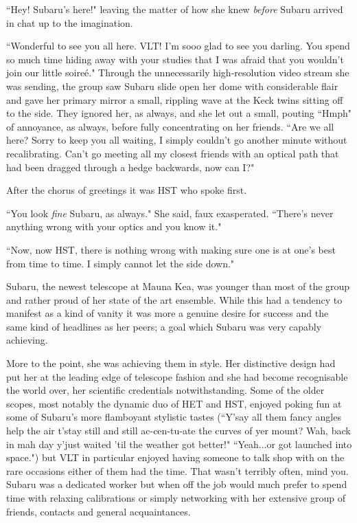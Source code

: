 \documentclass[12pt]{iopart}
\begin{document}
``Hey! Subaru's here!" leaving the matter of how she knew \emph{before} Subaru arrived in chat up to the imagination.

``Wonderful to see you all here. VLT! I'm sooo glad to see you darling. You spend so much time hiding away with your studies that I was afraid that you wouldn't join our little soire\'{e}." Through the unnecessarily high-resolution video stream she was sending, the group saw Subaru slide open her dome with considerable flair and gave her primary mirror a small, rippling wave at the Keck twins sitting off to the side. They ignored her, as always, and she let out a small, pouting ``Hmph" of annoyance, as always, before fully concentrating on her friends. ``Are we all here? Sorry to keep you all waiting, I simply couldn't go another minute without recalibrating. Can't go meeting all my closest friends with an optical path that had been dragged through a hedge backwards, now can I?"

After the chorus of greetings it was HST who spoke first.

``You look \emph{fine} Subaru, as always." She said, faux exasperated. ``There's never anything wrong with your optics and you know it."

``Now, now HST, there is nothing wrong with making sure one is at one's best from time to time. I simply cannot let the side down."

Subaru, the newest telescope at Mauna Kea, was younger than most of the group and rather proud of her state of the art ensemble. While this had a tendency to manifest as a kind of vanity it was more a genuine desire for success and the same kind of headlines as her peers; a goal which Subaru was very capably achieving.

More to the point, she was achieving them in style. Her distinctive design had put her at the leading edge of telescope fashion and she had become recognisable the world over, her scientific credentials notwithstanding. Some of the older scopes, most notably the dynamic duo of HET and HST, enjoyed poking fun at some of Subaru's more flamboyant stylistic tastes (``Y'say all them fancy angles help the air t'stay still and still ac-cen-tu-ate the curves of yer mount? Wah, back in mah day y'just waited 'til the weather got better!" ``Yeah...or got launched into space.") but VLT in particular enjoyed having someone to talk shop with on the rare occasions either of them had the time. That wasn't terribly often, mind you. Subaru was a dedicated worker but when off the job would much prefer to spend time with relaxing calibrations or simply networking with her extensive group of friends, contacts and general acquaintances.
\end{document}
